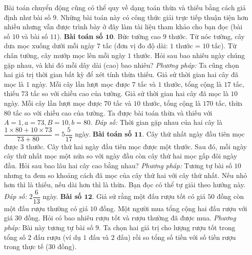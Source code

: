 \begin{multicols}{2}
	\vskip 0.1cm
	\vskip 0.1cm
	Bài toán chuyển động cũng có thể quy về dạng toán thừa và thiếu bằng cách giả định như bài số $9$. Những bài toán này có công thức giải trực tiếp thuận tiện hơn nhiều nhưng vẫn được trình bày ở đây làm tài liệu tham khảo cho bạn đọc (bài số $10$ và bài số $11$).
	\vskip 0.1cm
	\textbf{\color{diendantoanhoc}Bài toán số $\pmb{10.}$} Bức tường cao $9$ thước. Từ nóc tường, cây dưa mọc xuống dưới mỗi ngày $7$ tấc (đơn vị đo độ dài: $1$ thước = $10$ tấc). Từ chân tường, cây mướp mọc lên mỗi ngày $1$ thước. Hỏi sau bao nhiêu ngày chúng gặp nhau, và khi đó mỗi dây dài (cao) bao nhiêu?
	\vskip 0.1cm
	\textit{Phương pháp:} Ta cũng chọn hai giá trị thời gian bất kỳ để xét tính thừa thiếu.
	\vskip 0.1cm
	Giả sử thời gian hai cây đã mọc là $1$ ngày. Mỗi cây lần lượt mọc được $7$ tấc và $1$ thước, tổng cộng là $17$ tấc, thiếu $73$ tấc so với chiều cao của tường.
	\vskip 0.1cm
	Giả sử thời gian hai cây đã mọc là $10$ ngày. Mỗi cây lần lượt mọc được $70$ tấc và $10$ thước, tổng cộng là $170$ tấc, thừa $80$ tấc so với chiều cao của tường.
	\vskip 0.1cm
	Ta được bài toán thừa và thiếu với $A=1,a=73,B=10,b=80$.
	\vskip 0.1cm
	\textit{Đáp số:} Thời gian gặp nhau của hai cây là $\dfrac{1\times80 + 10\times73}{73 + 80} =5\dfrac{5}{17}$ ngày.
	\vskip 0.1cm
	\textbf{\color{diendantoanhoc}Bài toán số $\pmb{11.}$} Cây thứ nhất ngày đầu tiên mọc được $3$ thước. Cây thứ hai ngày đầu tiên mọc được một thước. Sau đó, mỗi ngày cây thứ nhất mọc một nửa so với ngày đầu còn cây thứ hai mọc gấp đôi ngày đầu. Hỏi sau bao lâu hai cây cao bằng nhau?
	\vskip 0.1cm
	\textit{Phương pháp:} Tương tự bài số $10$ nhưng ta đem so khoảng cách đã mọc của cây thứ hai với cây thứ nhất. Nếu nhỏ hơn thì là thiếu, nếu dài hơn thì là thừa. Bạn đọc có thể tự giải theo hướng này.
	\vskip 0.1cm
	\textit{Đáp số:} $2\dfrac{6}{13}$ ngày.
	\vskip 0.1cm
	\textbf{\color{diendantoanhoc}Bài số $\pmb{12.}$} Giả sử rằng một đấu rượu tốt có giá $50$ đồng còn một đấu rượu thường có giá $10$ đồng. Một người mua tổng cộng hai đấu rượu với giá $30$ đồng. Hỏi có bao nhiêu rượu tốt và rượu thường đã được mua.
	\vskip 0.1cm
	\textit{Phương pháp:} Bài này tương tự bài số $9$. Ta chọn hai giá trị cho lượng rượu tốt trong tổng số $2$ đấu rượu (ví dụ $1$ đấu và $2$ đấu) rồi so tổng số tiền với số tiền rượu trong thực tế ($30$ đồng). 

\end{multicols}
